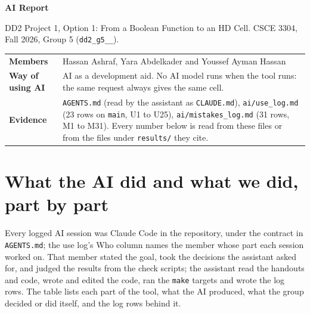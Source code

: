 \documentclass[10pt,a4paper]{article}
\newcommand{\code}[1]{\texttt{#1}}
\begin{document}
{\LARGE\bfseries\color{teal} AI Report}\par\vspace{0.6ex}
{\color{black!70} DD2 Project 1, Option 1: From a Boolean Function to an HD Cell. CSCE 3304, Fall 2026, Group 5 (\code{dd2\_g5\_\_}).}\par\vspace{1.2ex}

\begin{tabular}{@{}>{\bfseries\leavevmode\color{teal}}L{28mm}L{140mm}@{}}
Members & Hassan Ashraf, Yara Abdelkader and Youssef Ayman Hassan\\
Way of using AI & AI as a development aid. No AI model runs when the tool runs: the same request always gives the same cell.\\
Evidence & \code{AGENTS.md} (read by the assistant as \code{CLAUDE.md}), \code{ai/use\_log.md} (23 rows on \code{main}, U1 to U25), \code{ai/mistakes\_log.md} (31 rows, M1 to M31). Every number below is read from these files or from the files under \code{results/} they cite.\\
\end{tabular}

\section{What the AI did and what we did, part by part}
Every logged AI session was Claude Code in the repository, under the contract in \code{AGENTS.md}; the use log's Who column names the member whose part each session worked on. That member stated the goal, took the decisions the assistant asked for, and judged the results from the check scripts; the assistant read the handouts and code, wrote and edited the code, ran the \code{make} targets and wrote the log rows. The table lists each part of the tool, what the AI produced, what the group decided or did itself, and the log rows behind it.
\end{document}

